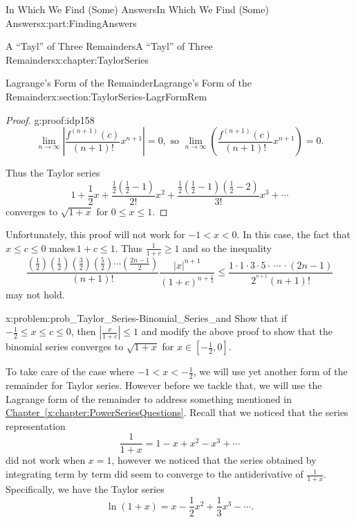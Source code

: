 \documentclass[oneside,10pt,]{book}
\newcommand{\xreffont}{\relax}
\numberwithin{equation}{section}
\newcommand{\abs}[1]{\left|#1\right|}
\newcommand{\lt}{<}
\begin{document}
\begin{partptx}{In Which We Find (Some) Answers}{}{In Which We Find (Some) Answers}{}{}{x:part:FindingAnswers}
\begin{chapterptx}{A ``Tayl'' of Three Remainders}{}{A ``Tayl'' of Three Remainders}{}{}{x:chapter:TaylorSeries}
\begin{sectionptx}{Lagrange's Form of the Remainder}{}{Lagrange's Form of the Remainder}{}{}{x:section:TaylorSeries-LagrFormRem}
\begin{proof}{}{g:proof:idp158}
\begin{equation*}
\lim_{n\rightarrow\infty}\abs{\frac{f^{(n+1)}(c)}{(n+1)!}x^{n+1}}=0, \text{ so } \lim_{n\rightarrow\infty}\left(\frac{f^{(n+1)}(c)}{(n+1)!}x^{n+1}\right)=0\text{.}
\end{equation*}
%
\par
Thus the Taylor series%
\begin{equation*}
1+\frac{1}{2}x+\frac{\frac{1}{2}\left(\frac{1}{2}-1\right)}{2!}x^2+\frac{\frac{1}{2}\left(\frac{1}{2}-1\right)\left(\frac{1}{2}-2\right)}{3!}x^3+\cdots
\end{equation*}
converges to \(\sqrt{1+x}\) for \(0\leq x\leq 1\).%
\end{proof}
Unfortunately, this proof will not work for \(-1\lt x\lt 0\). In this case, the fact that \(x\leq c\leq 0\) makes\(\,1+c\leq 1\). Thus \(\frac{1}{1+c}\geq 1\) and so the inequality%
\begin{equation*}
\frac{\left(\frac{1}{2}\right)\left(\frac{1}{2}\right)\left(\frac{3}{2}\right)\left(\frac{5}{2}\right)\cdots\left(\frac{2n-1}{2}\right)}{(n+1)!}\frac{|x|^{n+1}}{(1+c)^{n+\frac{1}{2}}}\leq\frac{1\cdot 1\cdot 3\cdot 5\cdot\,\cdots\,\cdot\left(2n-1\right)}{2^{^{n+1}}(n+1)!}
\end{equation*}
may not hold.%
\begin{problem}{}{x:problem:prob_Taylor_Series-Binomial_Series_and}%
 Show that if \(-\frac{1}{2}\leq x\leq c\leq 0\), then \(|\frac{x}{1+c}|\leq 1\) and modify the above proof to show that the binomial series converges to \(\sqrt{1+x}\) for \(x\in\left[-\frac{1}{2},0\right]\).%
\end{problem}
To take care of the case where \(-1\lt x\lt -\frac{1}{2}\), we will use yet another form of the remainder for Taylor series. However before we tackle that, we will use the Lagrange form of the remainder to address something mentioned in \hyperref[x:chapter:PowerSeriesQuestions]{Chapter~{\xreffont\ref{x:chapter:PowerSeriesQuestions}}}. Recall that we noticed that the series representation%
\begin{equation*}
\frac{1}{1+x}=1-x+x^2-x^3+\cdots
\end{equation*}
did not work when \(x=1\), however we noticed that the series obtained by integrating term by term did seem to converge to the antiderivative of \(\frac{1}{1+x}\). Specifically, we have the Taylor series%
\begin{equation*}
\ln\left(1+x\right)=x-\frac{1}{2}x^2+\frac{1}{3}x^3-\cdots\text{.}

\end{equation*}
\end{sectionptx}
\end{chapterptx}
\end{partptx}
\end{document}
